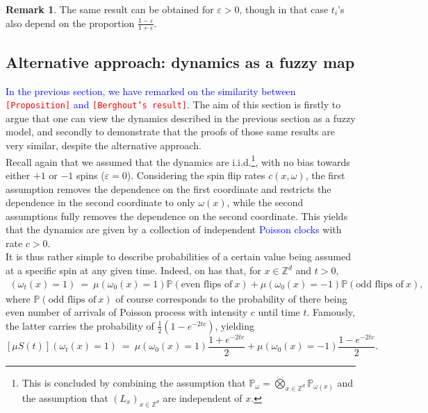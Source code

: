 \documentclass[12pt]{article}
\renewcommand{\P}{\mathbb{P}}
\newcommand{\Z}{\mathbb{Z}}
\newcommand{\1}{\mathbbm{1}}
\newcommand{\5}{\vspace{0.5cm}}
\theoremstyle{definition}
\newtheorem{rem}[thm]{Remark}
\begin{document}
\begin{rem}
The same result can be obtained for $\varepsilon>0$, though in that case $t_i$'s also depend on the proportion $\frac{1-\varepsilon}{1+\varepsilon}$.
\end{rem}


\subsection{Alternative approach: dynamics as a fuzzy map}

\textcolor{blue}{In the previous section, we have remarked on the similarity between \textcolor{red}{\texttt{[Proposition]}} and \textcolor{red}{\texttt{[Berghout's result]}}.} The aim of this section is firstly to argue that one can view the dynamics described in the previous section as a fuzzy model, and secondly to demonstrate that the proofs of those same results are very similar, despite the alternative approach. \\

Recall again that we assumed that the dynamics are i.i.d.\footnote{This is concluded by combining the assumption that $\P_\omega=\bigotimes_{x\in\Z^d}\P_{\omega(x)}$ and the assumption that $(L_x)_{x\in\Z^d}$ are independent of $x$.}, with no bias towards either $+1$ or $-1$ spins ($\varepsilon=0$). Considering the spin flip rates $c(x,\omega)$, the first assumption removes the dependence on the first coordinate and restricts the dependence in the second coordinate to only $\omega(x)$, while the second assumptions fully removes the dependence on the second coordinate. This yields that the dynamics are given by a collection of independent \textcolor{blue}{Poisson clocks} with rate $c>0$. \\

It is thus rather simple to describe probabilities of a certain value being assumed at a specific spin at any given time. Indeed, on has that, for $x\in\Z^d$ and $t>0$,
\begin{align*}
[\mu S(t)](\omega_t(x)=1) ~=~ \mu(\omega_0(x)=1)\P(\text{even flips of}~x) + \mu(\omega_0(x)=-1)\P(\text{odd flips of}~x),
\end{align*}
where $\P(\text{odd flips of}~x)$ of course corresponds to the probability of there being even number of arrivals of Poisson process with intensity $c$ until time $t$. Famously, the latter carries the probability of $\frac{1}{2}(1-e^{-2tc})$, yielding
$$[\mu S(t)](\omega_t(x)=1) ~=~ \mu(\omega_0(x)=1)\frac{1+e^{-2tc}}{2} + \mu(\omega_0(x)=-1)\frac{1-e^{-2tc}}{2}.$$
\end{document}
